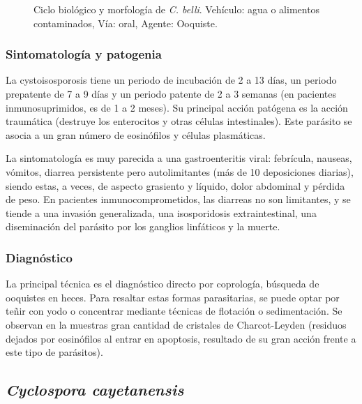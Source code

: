 \begin{multicols}{2}
\begin{figure}[H]
		\caption[Ciclo biológico y morfología de \textit{C. belli}]{Ciclo biológico y morfología de \textit{C. belli}. Vehículo: agua o alimentos contaminados, Vía: oral, Agente: Ooquiste.\label{fig:PARASIT:CbelliCBios}}
	\end{figure}
\end{multicols}
\subsubsection{Sintomatología y patogenia}
La cystoisosporosis tiene un periodo de incubación de 2 a 13 días, un periodo prepatente de 7 a 9 días y un periodo patente de 2 a 3 semanas (en pacientes inmunosuprimidos, es de 1 a 2 meses). Su principal acción patógena es la acción traumática (destruye los enterocitos y otras células intestinales). Este parásito se asocia a un gran número de eosinófilos y células plasmáticas.

La sintomatología es muy parecida a una gastroenteritis viral: febrícula, nauseas, vómitos, diarrea persistente pero autolimitantes (más de 10 deposiciones diarias), siendo estas, a veces, de aspecto grasiento y líquido, dolor abdominal y pérdida de peso. En pacientes inmunocomprometidos, las diarreas no son limitantes, y se tiende a una invasión generalizada, una isosporidosis extraintestinal, una diseminación del parásito por los ganglios linfáticos y la muerte.
\subsubsection{Diagnóstico}
La principal técnica es el diagnóstico directo por coprología, búsqueda de ooquistes en heces. Para resaltar estas formas parasitarias, se puede optar por teñir con yodo o concentrar mediante técnicas de flotación o sedimentación. Se observan en la muestras gran cantidad de cristales de Charcot-Leyden (residuos dejados por eosinófilos al entrar en apoptosis, resultado de su gran acción frente a este tipo de parásitos).
\newpage
\subsection{\textit{Cyclospora cayetanensis}}
